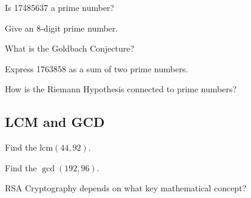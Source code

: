 \vspace{1in}

\begin{exercise}
Is 17485637 a prime number?
\end{exercise}

\vspace{1in}

\begin{exercise}
Give an 8-digit prime number.
\end{exercise}

\newpage

\begin{exercise}
What is the Goldbach Conjecture? 
\end{exercise}

\blanks

\begin{exercise}
Express 1763858 as a sum of two prime numbers.
\end{exercise}

\vspace{1in}

\begin{exercise}
How is the Riemann Hypothesis connected to prime numbers?
\end{exercise}

\blanks
\blanks

\subsection{LCM and GCD}

\begin{exercise}
Find the lcm$(44, 92)$.
\end{exercise}

\vspace{1in}

\begin{exercise}
Find the $\gcd(192, 96)$.
\end{exercise}

\vspace{1in}

\begin{exercise}
RSA Cryptography depends on what key mathematical concept?
\end{exercise}

\vspace{1in}

